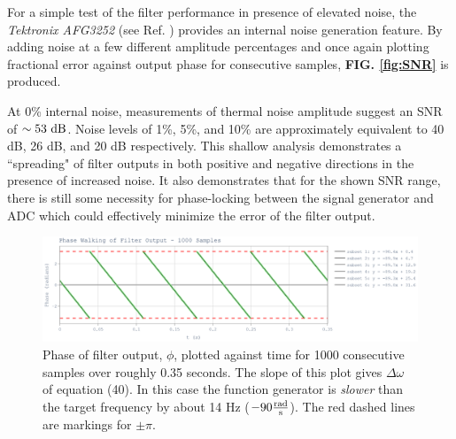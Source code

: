 \documentclass[reprint,amsmath,amssymb,aps,pra]{revtex4-2}
\begin{document}
For a simple test of the filter performance in presence of elevated noise, the \textit{Tektronix AFG3252} (see Ref. \cite{AFG-3252}) provides an internal noise generation feature. By adding noise at a few different amplitude percentages and once again plotting fractional error against output phase for consecutive samples, \textbf{FIG. \ref{fig:SNR}} is produced.

At 0\% internal noise, measurements of thermal noise amplitude suggest an SNR of $\sim 53\ \rm{dB}$. Noise levels of 1\%, 5\%, and 10\% are approximately equivalent to 40 dB, 26 dB, and 20 dB respectively. This shallow analysis demonstrates a ``spreading" of filter outputs in both positive and negative directions in the presence of increased noise. It also demonstrates that for the shown SNR range, there is still some necessity for phase-locking between the signal generator and ADC which could effectively minimize the error of the filter output.

\begin{figure}
    \centering
    \includegraphics[width=\linewidth]{figs/phase_walking.png}
    \caption{Phase of filter output, $\phi$, plotted against time for 1000 consecutive samples over roughly 0.35 seconds. The slope of this plot gives $\Delta \omega$ of equation (40). In this case the function generator is \textit{slower} than the target frequency by about 14 Hz ($-90 \frac{\rm{rad}}{\rm{s}}$). The red dashed lines are markings for $\pm \pi$. }
    \label{fig:phasewalking}
\end{figure}
\end{document}
